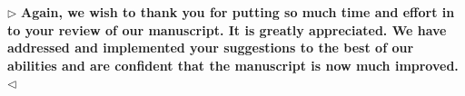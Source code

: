 \documentclass[12pt]{article}
\newenvironment{reply}{$\triangleright$\bfseries}{$\triangleleft$}
\renewenvironment{quote}
               {\list{}{\rightmargin\leftmargin}%
                \item\relax\normalfont}
               {\endlist}
\newcommand{\ttheta}{\boldsymbol{\theta}}
\begin{document}
\begin{reply}
	Again, we wish to thank you for putting so much time and effort in to your review of our manuscript.  It is greatly appreciated.  We have addressed and implemented your suggestions to the best of our abilities and are confident that the manuscript is now much improved.
\end{reply}

%
%
%
%
%
%
%
%	
\end{document}
